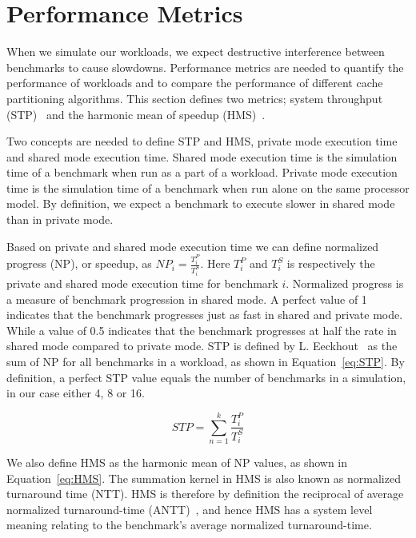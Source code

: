 \section{Performance Metrics}
\label{sec:methodology:metrics}

When we simulate our workloads, we expect destructive interference between benchmarks to cause slowdowns.
Performance metrics are needed to quantify the performance of workloads and to compare the performance of different cache partitioning algorithms.
This section defines two metrics; system throughput (STP)~\cite{Eeckhout2010} and the harmonic mean of speedup (HMS)~\cite{Eeckhout2010}.

Two concepts are needed to define STP and HMS, private mode execution time and shared mode execution time.
Shared mode execution time is the simulation time of a benchmark when run as a part of a workload.
Private mode execution time is the simulation time of a benchmark when run alone on the same processor model.
By definition, we expect a benchmark to execute slower in shared mode than in private mode.

Based on private and shared mode execution time we can define normalized progress (NP), or speedup, as ${NP}_i = \frac{T^{P}_i}{T^{S}_i}$.
Here $T^{P}_i$ and $T^{S}_i$ is respectively the private and shared mode execution time for benchmark $i$.
Normalized progress is a measure of benchmark progression in shared mode.
A perfect value of 1 indicates that the benchmark progresses just as fast in shared and private mode.
While a value of 0.5 indicates that the benchmark progresses at half the rate in shared mode compared to private mode.
STP is defined by L. Eeckhout~\cite{Eeckhout2010} as the sum of NP for all benchmarks in a workload, as shown in Equation~\ref{eq:STP}.
By definition, a perfect STP value equals the number of benchmarks in a simulation, in our case either 4, 8 or 16.

\begin{equation} \label{eq:STP} 
 {STP} = {\sum\limits_{n=1}^{k}}\frac{T^{P}_i}{T^{S}_i}
\end{equation}

We also define HMS as the harmonic mean of NP values, as shown in Equation~\ref{eq:HMS}.
The summation kernel in HMS is also known as normalized turnaround time (NTT).
HMS is therefore by definition the reciprocal of average normalized turnaround-time (ANTT)~\cite{Eeckhout2010}, and hence HMS has a system level meaning relating to the benchmark's average normalized turnaround-time.

